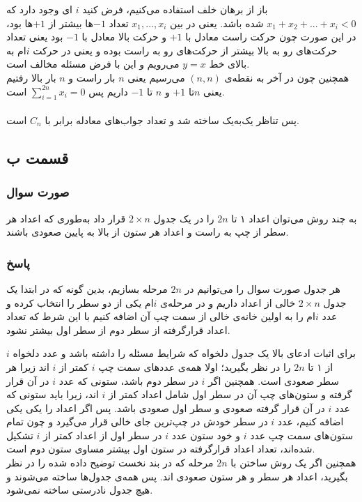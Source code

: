 \documentclass[12pt,a4paper]{article}
\begin{document}
باز از برهان خلف استفاده می‌کنیم، فرض کنید $i$ ای وجود دارد که $x_1+x_2 + ... +x_i < 0$ شده باشد.  یعنی در بین $x_1, ..., x_i$ تعداد $-1$ها بیشتر از $+1$ها بود، در این صورت چون حرکت راست معادل با $+1$ و حرکت بالا معادل با $-1$ بود یعنی تعداد حرکت‌های رو به بالا بیشتر از حرکت‌های رو به راست بوده و یعنی در حرکت $i$ام به بالای خط $y=x$ می‌رویم و این با فرض مسئله مخالف است.
\\
همچنین چون در آخر به نقطه‌ی $(n, n)$ می‌رسیم یعنی $n$ بار راست و $n$ بار بالا رفتیم یعنی $n$تا $+1$ و $n$ تا $-1$ داریم پس $\sum_{i=1}^{2n} x_i = 0$ است.
\\
\\
پس تناظر یک‌به‌یک ساخته شد و تعداد جواب‌های معادله برابر با $C_n$ است.

\subsection{قسمت ب}
\subsubsection{صورت سوال}
به چند روش می‌توان اعداد ۱ تا $2n$ را در یک جدول $2\times n$ قرار داد به‌طوری که اعداد هر سطر از چپ به راست و اعداد هر ستون از بالا به پایین صعودی باشند.
\subsubsection{پاسخ}
هر جدول صورت سوال را می‌توانیم در $2n$ مرحله بسازیم، بدین گونه که در ابتدا یک جدول $2\times n$ خالی از اعداد داریم و در مرحله‌ی $i$ام یکی از دو سطر را انتخاب کرده و عدد $i$ام را به اولین خانه‌ی خالی از سمت چپ آن اضافه کنیم با این شرط که تعداد اعداد قرارگرفته از سطر دوم از سطر اول بیشتر نشود.

برای اثبات ادعا‌ی بالا یک جدول دلخواه که شرایط مسئله را داشته باشد و عدد دلخواه $i$ از ۱ تا $2n$ را در نظر بگیرید؛ اولا همه‌ی عددهای سمت چپ $i$ کمتر از $i$ اند زیرا هر سطر صعودی است. همچنین اگر $i$ در سطر دوم باشد، ستونی که عدد $i$ در آن قرار گرفته و ستون‌های چپ آن در سطر اول شامل اعداد کمتر از $i$ اند، زیرا باید ستونی که عدد $i$ در آن قرار گرفته صعودی و سطر اول صعودی باشد. پس اگر اعداد را یکی یکی اضافه کنیم، عدد $i$ در سطر خودش در چپ‌ترین جای خالی قرار می‌گیرد و چون تمام ستون‌های سمت چپ عدد $i$ و خود ستون عدد $i$ در سطر اول از اعداد کمتر از $i$ تشکیل شده‌اند، تعداد اعداد قرارگرفته در ستون اول بیشتر مساوی ستون دوم است.
\\
همچنین اگر یک روش ساختن با $2n$ مرحله که در بند نخست توضیح داده شده را در نظر بگیرید، اعداد هر سطر و هر ستون صعودی اند. پس همه‌ی جدول‌ها ساخته می‌شوند و هیچ جدول نادرستی ساخته نمی‌شود.
\end{document}
